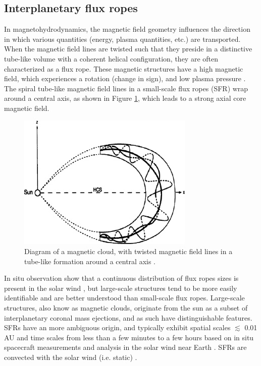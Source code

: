 \subsection{Interplanetary flux ropes}
In magnetohydrodynamics, the magnetic field geometry influences the direction in which various quantities (energy, plasma quantities, etc.) are transported. When the magnetic field lines are twisted such that they preside in a distinctive tube-like volume with a coherent helical configuration, they are often characterized as a flux rope. These magnetic structures have a high magnetic field, which experiences a rotation (change in sign), and low plasma pressure \citep{Cartwright:2008}. The spiral tube-like magnetic field lines in a small-scale flux ropes (\gls{SFR}) wrap around a central axis, as shown in Figure \ref{fig:FR-diagram}, which leads to a strong axial core magnetic field.

\begin{figure}[ht!]
    \centering
    \includegraphics[width=0.75\textwidth]{Figures/fluxrope.png}
    \caption{Diagram of a magnetic cloud, with twisted magnetic field lines in a tube-like formation around a central axis \citep{Feng:2007}.}
    \label{fig:FR-diagram}
\end{figure}

In situ observation show that a continuous distribution of flux ropes sizes is present in the solar wind \citep{Feng:2007}, but large-scale structures tend to be more easily identifiable and are better understood than small-scale flux ropes. Large-scale structures, also know as magnetic clouds, originate from the sun as a subset of interplanetary coronal mass ejections, and as such have distinguishable features. SFRs have an more ambiguous origin, and typically exhibit spatial scales $\lesssim$ 0.01 \gls{AU} and time scales from less than a few minutes to a few hours based on in situ spacecraft measurements and analysis in the solar wind near Earth \citep{Cartwright:2010, Feng:2007, Hu:2018}. SFRs are convected with the solar wind (i.e. static) \citep{Cartwright:2008}.


